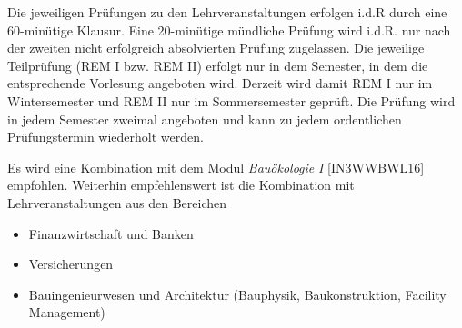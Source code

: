 \begin{course}

\setdoclanguagegerman
{}



\coursehead


\label{cour_6861.dp_997}


\begin{styleenv}
\begin{assessment}
Die jeweiligen Prüfungen zu den Lehrveranstaltungen erfolgen i.d.R durch eine 60-minütige Klausur. Eine 20-minütige mündliche Prüfung wird i.d.R. nur nach der zweiten nicht erfolgreich absolvierten Prüfung zugelassen. Die jeweilige Teilprüfung (REM I bzw. REM II) erfolgt nur in dem Semester, in dem die entsprechende Vorlesung angeboten wird. Derzeit wird damit REM I nur im Wintersemester und REM II nur im Sommersemester geprüft. Die Prüfung wird in jedem Semester zweimal angeboten und kann zu jedem ordentlichen Prüfungstermin wiederholt werden.


\end{assessment}

\begin{conditions}Es wird eine Kombination mit dem Modul \emph{Bauökologie} \emph{I} [IN3WWBWL16] empfohlen. Weiterhin empfehlenswert ist die Kombination mit Lehrveranstaltungen aus den Bereichen

 \begin{itemize}\item Finanzwirtschaft und Banken  \item Versicherungen  \item Bauingenieurwesen und Architektur (Bauphysik, Baukonstruktion, Facility Management)  \end{itemize}\end{conditions}


\end{styleenv}


\end{course}
